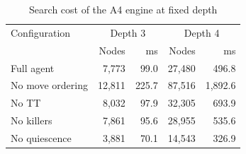 \begin{table}[!htbp]
\centering\caption{Search cost of the A4 engine at fixed depth}\label{tab:cost-a4}
\footnotesize
\begin{tabular}{@{}lrrrr@{}}
\toprule
Configuration & \multicolumn{2}{c}{Depth 3} & \multicolumn{2}{c}{Depth 4} \\ & Nodes & ms & Nodes & ms \\
\midrule
Full agent & 7,773 & 99.0 & 27,480 & 496.8 \\
No move ordering & 12,811 & 225.7 & 87,516 & 1,892.6 \\
No TT & 8,032 & 97.9 & 32,305 & 693.9 \\
No killers & 7,861 & 95.6 & 28,955 & 535.6 \\
No quiescence & 3,881 & 70.1 & 14,543 & 326.9 \\
\bottomrule
\end{tabular}
\par\vspace{2pt}{\scriptsize Means over 386 middle-game positions.}
\end{table}
